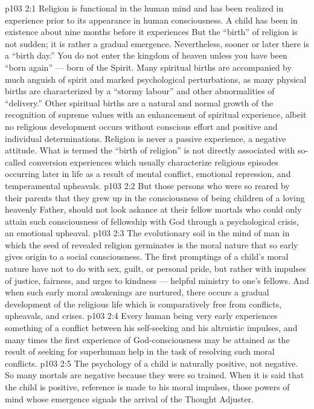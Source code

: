 \vs p103 2:1 Religion is functional in the human mind and has been realized in experience prior to its appearance in human consciousness. A child has been in existence about nine months before it experiences  But the “birth” of religion is not sudden; it is rather a gradual emergence. Nevertheless, sooner or later there is a “birth day.” You do not enter the kingdom of heaven unless you have been “born again” --- born of the Spirit. Many spiritual births are accompanied by much anguish of spirit and marked psychological perturbations, as many physical births are characterized by a “stormy labour” and other abnormalities of “delivery.” Other spiritual births are a natural and normal growth of the recognition of supreme values with an enhancement of spiritual experience, albeit no religious development occurs without conscious effort and positive and individual determinations. Religion is never a passive experience, a negative attitude. What is termed the “birth of religion” is not directly associated with so\hyp{}called conversion experiences which usually characterize religious episodes occurring later in life as a result of mental conflict, emotional repression, and temperamental upheavals.
\vs p103 2:2 But those persons who were so reared by their parents that they grew up in the consciousness of being children of a loving heavenly Father, should not look askance at their fellow mortals who could only attain such consciousness of fellowship with God through a psychological crisis, an emotional upheaval.
\vs p103 2:3 The evolutionary soil in the mind of man in which the seed of revealed religion germinates is the moral nature that so early gives origin to a social consciousness. The first promptings of a child’s moral nature have not to do with sex, guilt, or personal pride, but rather with impulses of justice, fairness, and urges to kindness --- helpful ministry to one’s fellows. And when such early moral awakenings are nurtured, there occurs a gradual development of the religious life which is comparatively free from conflicts, upheavals, and crises.
\vs p103 2:4 Every human being very early experiences something of a conflict between his self\hyp{}seeking and his altruistic impulses, and many times the first experience of God\hyp{}consciousness may be attained as the result of seeking for superhuman help in the task of resolving such moral conflicts.
\vs p103 2:5 The psychology of a child is naturally positive, not negative. So many mortals are negative because they were so trained. When it is said that the child is positive, reference is made to his moral impulses, those powers of mind whose emergence signals the arrival of the Thought Adjuster.
